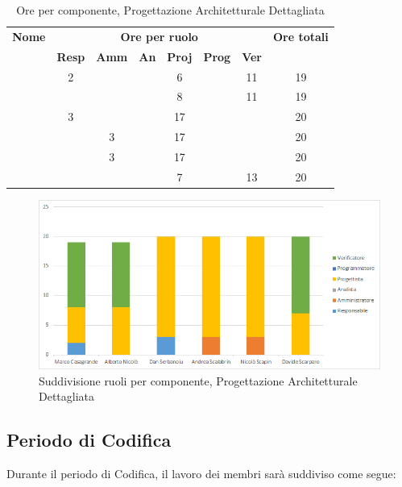 \begin{table}[H]
	\begin{center}
		\begin{tabular}{|c|c|c|c|c|c|c|c|}
			\hline
			\textbf{Nome} & \multicolumn{6}{c|}{\textbf{Ore per ruolo}} & \textbf{Ore totali} \\\cline{2-7}
			& \textbf{Resp} & \textbf{Amm} & \textbf{An} & \textbf{Proj} & \textbf{Prog} & \textbf{Ver} & \\
			\hline
			\MC			&	2	&		&		&	6	&		&	11	&	19	\\
			\hline
			\AN			&		&		&		&	8	&   	&	11	& 	19	\\
			\hline
			\DAN		&	3	&		&		&	17	&		&		&	20	\\
			\hline
			\AS			&		&	3	&	 	&	17	&	 	& 		&	20	\\
			\hline
			\NS 		&		&	3	&		&	17	&		& 		&	20	\\
			\hline
			\DS			& 		&		&		&	7	&		&	13	&	20	\\
			\hline
		\end{tabular}
	\end{center}
	\caption{Ore per componente, Progettazione Architetturale Dettagliata}
\end{table}

\begin{figure}[H]
	\centering
	\includegraphics[scale=0.6]{img/6-3.png}
	\caption{Suddivisione ruoli per componente, Progettazione Architetturale Dettagliata}
\end{figure}

\newpage
\subsection{Periodo di Codifica}
Durante il periodo di Codifica, il lavoro dei membri sarà suddiviso come segue:

